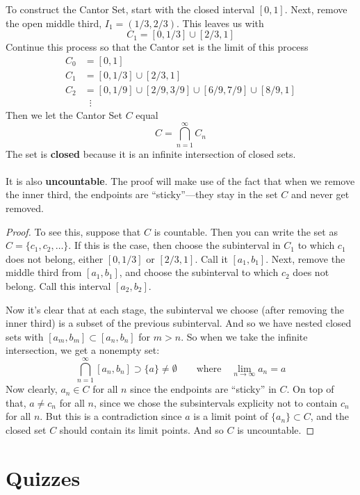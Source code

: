 \documentclass[12pt]{article}
\theoremstyle{plain}
\theoremstyle{definition}
\theoremstyle{remark}
\begin{document}
To construct the Cantor Set, start with the closed interval $[0,1]$. Next, remove the open middle third, $I_1 = (1/3, 2/3)$. This leaves us with 
    \[ C_1 = [0, 1/3] \cup [2/3, 1] \]
Continue this process so that the Cantor set is the limit of this process
\begin{align*}
    C_0 &= [0,1] \\
    C_1 &= [0,1/3] \cup [2/3, 1] \\
    C_2 &= [0,1/9] \cup [2/9, 3/9]  \cup [6/9, 7/9] \cup [8/9, 1]
        \\
    &\;\;\vdots 
\end{align*}
Then we let the Cantor Set $C$ equal
    \[ C = \bigcap^\infty_{n=1} C_n \]
    The set is \textbf{closed} because it is an infinite intersection of closed sets.
\\
\\
It is also \textbf{uncountable}. The proof will make use of the fact that when we remove the inner third, the endpoints are ``sticky''---they stay in the set $C$ and never get removed.
\begin{proof}
To see this, suppose that $C$ is countable. Then you can write the set as $C = \{c_1, c_2, \ldots\}$. If this is the case, then choose the subinterval in $C_1$ to which $c_1$ does not belong, either $[0,1/3]$ or $[2/3,1]$. Call it $[a_1, b_1]$. Next, remove the middle third from $[a_1, b_1]$, and choose the subinterval to which $c_2$ does not belong. Call this interval $[a_2, b_2]$. 

Now it's clear that at each stage, the subinterval we choose (after removing the inner third) is a subset of the previous subinterval. And so we have nested closed sets with $[a_m, b_m] \subset [a_n, b_n]$ for $m>n$. So when we take the infinite intersection, we get a nonempty set:
\[ 
    \bigcap^\infty_{n=1} [a_n, b_n] \supset \{a\} \neq 
    \emptyset\qquad \text{where} \quad 
    \lim_{n\rightarrow\infty} a_n = a
\]
Now clearly, $a_n\in C$ for all $n$ since the endpoints are ``sticky'' in $C$.  On top of that, $a\neq c_n$ for all $n$, since we chose the subsintervals explicity not to contain $c_n$ for all $n$.  But this is a contradiction since $a$ is a limit point of $\{a_n\}\subset C$, and the closed set $C$ should contain its limit points. And so $C$ is uncountable.
\end{proof}


\newpage
\section{Quizzes}
\end{document}
